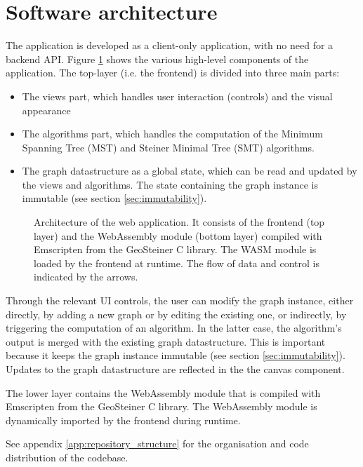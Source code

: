 \documentclass{l4proj}
\begin{document}
\section{Software architecture}
\label{sec:software_architecture}
The application is developed as a client-only application, with no need for a backend API. Figure \ref{fig:architecture} shows the various high-level components of the application. The top-layer (i.e. the frontend) is divided into three main parts:
\begin{itemize}
    \item The views part, which handles user interaction (controls) and the visual appearance
    \item The algorithms part, which handles the computation of the Minimum Spanning Tree (MST) and Steiner Minimal Tree (SMT) algorithms.
    \item The graph datastructure as a global state, which can be read and updated by the views and algorithms. The state containing the graph instance is immutable (see section \ref{sec:immutability}).
\end{itemize}

\begin{figure}[h]
    \centering
    
    \caption{Architecture of the web application. It consists of the frontend (top layer) and the WebAssembly module (bottom layer) compiled with Emscripten from the GeoSteiner C library. The WASM module is loaded by the frontend at runtime. The flow of data and control is indicated by the arrows.}
    \label{fig:architecture}
\end{figure}

Through the relevant UI controls, the user can modify the graph instance, either directly, by adding a new graph or by editing the existing one, or indirectly, by triggering the computation of an algorithm. In the latter case, the algorithm's output is merged with the existing graph datastructure. This is important because it keeps the graph instance immutable (see section \ref{sec:immutability}).
Updates to the graph datastructure are reflected in the the canvas component.

The lower layer contains the WebAssembly module that is compiled with Emscripten from the GeoSteiner C library. The WebAssembly module is dynamically imported by the frontend during runtime.

See appendix \ref{app:repository_structure} for the organisation and code distribution of the codebase.
\end{document}
